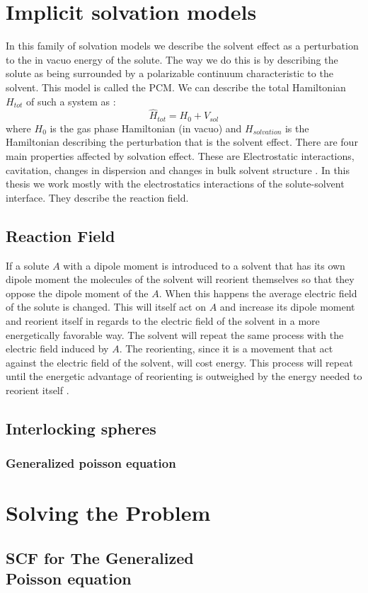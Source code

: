 \documentclass[../master_thesis.tex]{subfiles}
\begin{document}
\section{Implicit solvation models}
In this family of solvation models we describe the solvent effect as a
perturbation to the in vacuo energy of the solute. The way we do this is by
describing the solute as being surrounded by a polarizable continuum
characteristic to the solvent. This model is called the \ac{PCM}. We can
describe the total Hamiltonian $H_{tot}$ of such a system as
\cite{Tomasi:1994wt}:
\begin{equation}
  \hat{H}_{tot} = H_0 + V_{sol}
\end{equation}
where $H_0$ is the gas phase Hamiltonian (in vacuo) and $H_{solvation}$ is the
Hamiltonian describing the perturbation that is the solvent effect. There are
four main properties affected by solvation effect. These are Electrostatic
interactions, cavitation, changes in dispersion and changes in bulk solvent
structure \cite{Cramer:2004}.
In this thesis we work mostly with the electrostatics interactions of the
solute-solvent interface. They describe the reaction field.

\subsection{Reaction Field}
If a solute $A$ with a dipole moment is introduced to a solvent that has its
own dipole moment the molecules of the solvent will reorient themselves so that
they oppose the dipole moment of the $A$. When this happens the average electric
field of the solute is changed. This will itself act on $A$ and increase its dipole
moment and reorient itself in regards to the electric field of the solvent in a
more energetically favorable way. The solvent will repeat the same process with
the electric field induced by $A$. The reorienting, since it is a movement
that act against the electric field of the solvent, will cost energy. This
process will repeat until the energetic advantage of reorienting is outweighed
by the energy needed to reorient itself \cite{Cramer:2004}.



\subsection{Interlocking spheres}
\subsubsection{Generalized poisson equation}
\section{Solving the Problem}
\subsection{\ac{SCF} for The Generalized \\ Poisson equation}

\biblio
\end{document}
